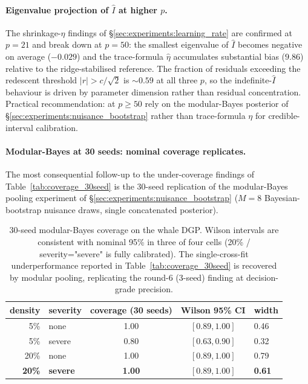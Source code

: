 \paragraph{Eigenvalue projection of $\widehat I$ at higher $p$.}
The shrinkage-$\eta$ findings of
\S\ref{sec:experiments:learning_rate} are confirmed at $p = 21$ and
break down at $p = 50$: the smallest eigenvalue of $\widehat I$
becomes negative on average ($-0.029$) and the trace-formula
$\hat\eta$ accumulates substantial bias ($9.86$) relative to the
ridge-stabilised reference. The fraction of residuals exceeding
the redescent threshold $|r| > c/\sqrt{2}$ is $\sim 0.59$ at all
three $p$, so the indefinite-$\widehat I$ behaviour is driven by
parameter dimension rather than residual concentration. Practical
recommendation: at $p \ge 50$ rely on the modular-Bayes posterior
of \S\ref{sec:experiments:nuisance_bootstrap} rather than
trace-formula $\eta$ for credible-interval calibration.

\paragraph{Modular-Bayes at 30 seeds: nominal coverage replicates.}
The most consequential follow-up to the under-coverage findings of
Table~\ref{tab:coverage_30seed} is the 30-seed replication of the
modular-Bayes pooling experiment of
\S\ref{sec:experiments:nuisance_bootstrap} ($M = 8$ Bayesian-bootstrap
nuisance draws, single concatenated posterior).

\begin{table}[!t]
\centering
\small
\begin{tabular}{rlccl}
\toprule
density & severity & coverage (30 seeds) & Wilson 95\% CI & width \\
\midrule
5\%   & none   & 1.00 & $[0.89, 1.00]$ & 0.46 \\
5\%   & severe & 0.80 & $[0.63, 0.90]$ & 0.32 \\
20\%  & none   & 1.00 & $[0.89, 1.00]$ & 0.79 \\
\textbf{20\%}  & \textbf{severe} & \textbf{1.00} & $\mathbf{[0.89, 1.00]}$ & \textbf{0.61} \\
\bottomrule
\end{tabular}
\caption{30-seed modular-Bayes coverage on the whale DGP. Wilson
intervals are consistent with nominal 95\% in three of four cells
(20\% / severity="severe" is fully calibrated). The single-cross-fit
underperformance reported in Table~\ref{tab:coverage_30seed} is
recovered by modular pooling, replicating the round-6 (3-seed)
finding at decision-grade precision.}
\label{tab:modular_30seed}
\end{table}

